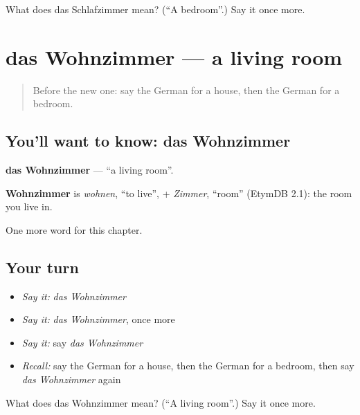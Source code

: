 \begin{tcolorbox}[breakable,colback=teal!4,colframe=teal!35!black,title={Before you move on}]
What does das Schlafzimmer mean? (\textquotedblleft{}A bedroom\textquotedblright{}.) Say it once more.
\end{tcolorbox}
\section[das Wohnzimmer]{das Wohnzimmer — a living room}

\label{lesson:GE-C161-wohnzimmer}



\begin{quote}
Before the new one: say the German for a house, then the German for a bedroom.
\end{quote}

\subsection*{You'll want to know: das Wohnzimmer}
\textbf{das Wohnzimmer} — \textquotedblleft{}a living room\textquotedblright{}.

\begin{cousinweb}
\textbf{Wohnzimmer} is \emph{wohnen}, \textquotedblleft{}to live\textquotedblright{}, + \emph{Zimmer}, \textquotedblleft{}room\textquotedblright{} (EtymDB 2.1): the room you live in.
\end{cousinweb}

\begin{grammarlens}[title={What you've built}]
One more word for this chapter.
\end{grammarlens}

\subsection*{Your turn}
\begin{itemize}
\raggedright
  \item \emph{Say it:} \emph{das Wohnzimmer}
  \item \emph{Say it:} \emph{das Wohnzimmer}, once more
  \item \emph{Say it:} say \emph{das Wohnzimmer}
  \item \emph{Recall:} say the German for a house, then the German for a bedroom, then say \emph{das Wohnzimmer} again
\end{itemize}

\begin{tcolorbox}[breakable,colback=teal!4,colframe=teal!35!black,title={Before you move on}]
What does das Wohnzimmer mean? (\textquotedblleft{}A living room\textquotedblright{}.) Say it once more.
\end{tcolorbox}
